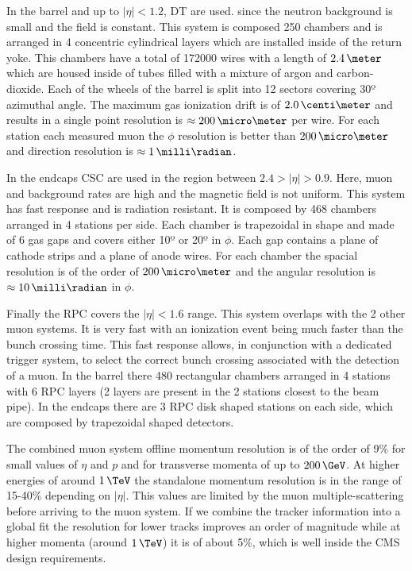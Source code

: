In the barrel and up to $|\eta|<1.2$, \gls{DT} are used. since the neutron background is small and the field is constant. This system is composed 250 chambers and is arranged in 4 concentric cylindrical layers which are installed inside of the return yoke. This chambers have a total of 172000 wires with a length of $2.4\,\meter$ which are housed inside of tubes filled with a mixture of argon and carbon-dioxide. Each of the wheels of the barrel is split into 12 sectors covering 30º azimuthal angle. The maximum gas ionization drift is of $2.0\,\centi\meter$ and results in a single point resolution is $\approx 200\,\micro\meter$ per wire. For each station each measured muon the $\phi$ resolution is better than $200\,\micro\meter$ and direction resolution is $\approx 1\,\milli\radian$.

In the endcaps \gls{CSC} are used in the region between $2.4>|\eta|>0.9$. Here, muon and background rates are high and the magnetic field is not uniform. This system has fast response and is radiation resistant. It is composed by 468 chambers arranged in 4 stations per side. Each chamber is trapezoidal in shape and made of 6 gas gaps and covers either 10º or 20º in $\phi$. Each gap contains a plane of cathode strips and a plane of anode wires. For each chamber the spacial resolution is of the order of $200\,\micro\meter$ and the angular resolution is $\approx 10\,\milli\radian$ in $\phi$.

Finally the \gls{RPC} covers the $|\eta|<1.6$ range. This system overlaps with the 2 other muon systems. It is very fast with an ionization event being much faster than the bunch crossing time. This fast response allows, in conjunction with a dedicated trigger system, to select the correct bunch crossing associated with the detection of a muon. In the barrel there 480 rectangular chambers arranged in 4 stations with 6 \gls{RPC} layers (2 layers are present in the 2 stations closest to the beam pipe). In the endcaps there are 3 \gls{RPC} disk shaped stations on each side, which are composed by trapezoidal shaped detectors.

The combined muon system offline momentum resolution is of the order of 9\% for small values of $\eta$ and $p$ and for transverse momenta of up to $200\,\GeV$. At higher energies of around $1\,\TeV$ the standalone momentum resolution is in the range of 15-40\% depending on $|\eta|$. This values are limited by the muon multiple-scattering before arriving to the muon system. If we combine the tracker information into a global fit the resolution for lower \pt tracks improves an order of magnitude while at higher momenta (around $1\,\TeV$) it is of about 5\%, which is well inside the \gls{CMS} design requirements.

